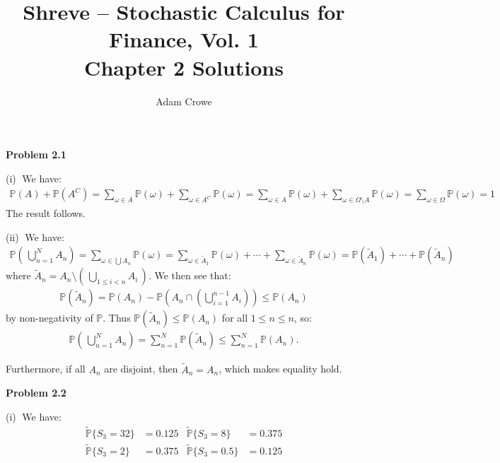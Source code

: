 \documentclass[12pt, letterpaper]{article}
\author{Adam Crowe}
\title{Shreve -- Stochastic Calculus for Finance, Vol. 1 \\ Chapter 2 Solutions}
\begin{document}
\maketitle

\vspace{5mm}
\noindent
\textbf{Problem 2.1}

\vspace{5mm}
\noindent
(i)$\;$ We have:
\begin{gather*}
    \mathbb P(A) + \mathbb P(A^C) =
    \sum_{\omega \in A} \mathbb P(\omega) + \sum_{\omega \in A^C} \mathbb P(\omega)=
    \sum_{\omega \in A} \mathbb P(\omega) + \sum_{\omega \in \Omega \setminus A} \mathbb P(\omega)
    = \sum_{\omega \in \Omega} \mathbb P(\omega) = 1
\end{gather*}
The result follows.

\rightline{$\square$}

\vspace{5mm}
\noindent
(ii)$\;$ We have:
\begin{gather*}
    \mathbb P \left( \, \bigcup_{n=1}^N A_n \right)
    = \sum_{\omega \in \bigcup A_n} \mathbb P(\omega)
    = \sum_{\omega \in \tilde A_1} \mathbb P(\omega)
    + \cdots
    +\sum_{\omega \in \tilde A_n } \mathbb P(\omega)
    = \mathbb P(\tilde A_1) + \cdots + \mathbb P(\tilde A_n)
\end{gather*}
where $\tilde A_n = A_n \setminus \left( \, \bigcup_{1 \leq i < n} A_i \, \right)$.
We then see that:
\begin{gather*}
    \mathbb P(\tilde A_n) = \mathbb P(A_n) - \mathbb P\left( A_n \cap \left(\bigcup_{i=1}^{n-1} A_i \right) \right)
    \leq \mathbb P(A_n)
\end{gather*}
by non-negativity of $\mathbb P$.
Thus $\mathbb P(\tilde A_n) \leq \mathbb P(A_n)$ for all $1 \leq n \leq n$, so:
\begin{gather*}
    \mathbb P \left( \, \bigcup_{n=1}^N A_n \right)
    = \sum_{n=1}^N \mathbb P(\tilde A_n) \leq \sum_{n=1}^N \mathbb P(A_n).
\end{gather*}

\vspace{5mm}
Furthermore, if all $A_n$ are disjoint, then $\tilde A_n = A_n$, which makes equality hold.

\rightline{$\square$}

\vspace{5mm}
\noindent
\textbf{Problem 2.2} $\;$ 

\vspace{5mm}
\noindent
(i)$\;$ We have:
\begin{align*}
    \tilde{\mathbb P} \{ S_3 = 32 \} &= 0.125 & \tilde{\mathbb P} \{ S_3 = 8 \} &= 0.375 \\
    \tilde{\mathbb P} \{ S_3 = 2 \} &= 0.375 & \tilde{\mathbb P} \{ S_3 = 0.5 \} &= 0.125
\end{align*}
\end{document}
